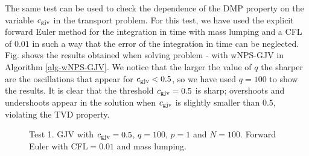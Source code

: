The same test can be used to check the dependence of the DMP property on the variable $c_{\rm gjv}$ in the transport problem.  For this test, we have used the explicit forward Euler method for the integration in time with mass lumping and a CFL of $0.01$ in such a way that the error of the integration in time can be neglected. Fig.  shows the results obtained when solving problem - with  wNPS-GJV in Algorithm \ref{alg-wNPS-GJV}. We notice that the larger the value of $q$ the sharper are the oscillations that appear for $c_{\rm gjv} < 0.5$, so we have used $q=100$ to show the results. It is clear that the threshold $c_{\rm gjv} = 0.5$ is sharp; overshoots and undershoots appear in the solution when $c_{\rm gjv}$ is slightly smaller than $0.5$, violating the TVD property.
\begin{figure}%
\centering
{}%
%
\caption{Test 1. GJV with $c_{\rm gjv}=0.5$, $q=100$, $p=1$ and $N=100$. Forward Euler with CFL$=0.01$ and mass lumping.}\label{fig-SZ_AD_2}%
\end{figure}


